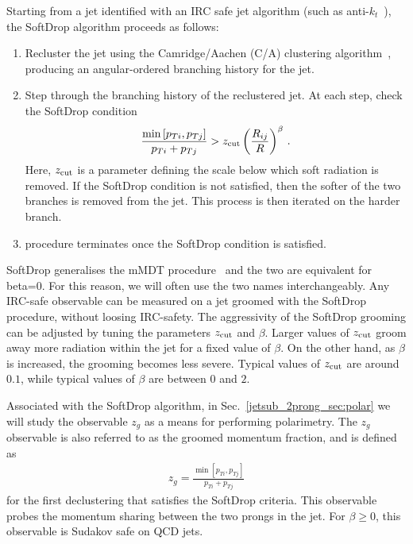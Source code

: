 \documentclass[11pt]{cernrep}
\begin{document}
Starting from a jet identified with an IRC safe jet algorithm (such as
anti-$k_t$~\cite{Cacciari:2008gp}),
%
the SoftDrop algorithm proceeds as follows:
%
\begin{enumerate}
%
\item Recluster the jet using the Camridge/Aachen (C/A) clustering
  algorithm~\cite{Dokshitzer:1997in,Wobisch:1998wt,Wobisch:2000dk},
  producing an angular-ordered branching history for the jet.
%
\item Step through the branching history of the reclustered jet.  At each step, check the SoftDrop condition
\begin{align}\label{jetsub_2prong_eq:sd_cut}
\frac{\min\left[ p_{Ti}, p_{Tj}  \right]}{p_{Ti}+p_{Tj}}> {z_{\rm cut}} \left(   \frac{R_{ij}}{R}\right)^\beta \,.
\end{align}
Here, ${z_{\rm cut}}$ is a parameter defining the scale below which soft radiation is removed.  If the SoftDrop condition is not satisfied, then the softer of the two branches is removed from the jet.  This process is then iterated on the harder branch.
%
\item procedure terminates once the SoftDrop condition is satisfied.
%
\end{enumerate}
SoftDrop generalises the mMDT procedure~\cite{Dasgupta:2013ihk} and
the two are equivalent for beta=0. For this reason, we will often use
the two names interchangeably.
%
Any IRC-safe observable can be measured on a jet groomed with the
SoftDrop procedure, without loosing IRC-safety.
%
%
The aggressivity of the SoftDrop grooming can be adjusted by
tuning the parameters ${z_{\rm cut}}$ and $\beta$.
%
Larger values of ${z_{\rm cut}}$ groom away more radiation within the jet for a fixed value of $\beta$.
%
On the other hand, as $\beta$ is increased, the grooming becomes less
severe.
%
Typical values of ${z_{\rm cut}}$ are around $0.1$, while typical
values of $\beta$ are between $0$ and $2$.

Associated with the SoftDrop algorithm, in Sec.~\ref{jetsub_2prong_sec:polar} we will study the observable $z_g$ as a means for performing polarimetry.
%
The $z_g$ observable is also referred to as the groomed momentum fraction, and is defined as
%
\begin{align}
z_g=\frac{\min\left[ p_{Ti}, p_{Tj}  \right]}{p_{Ti}+p_{Tj}}
\end{align}
%
for the first declustering that satisfies the SoftDrop criteria.
%
This observable probes the momentum sharing between the two prongs in the
jet. For $\beta \ge 0$, this observable is Sudakov safe \cite{Larkoski:2013paa,Larkoski:2015lea} on QCD
jets.
\end{document}
